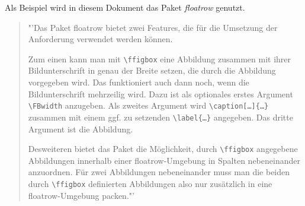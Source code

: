 Als Beispiel wird in diesem Dokument das Paket \emph{floatrow} genutzt.
\begin{quote}
	"'Das Paket floatrow bietet zwei Features, die für die Umsetzung der Anforderung verwendet werden können.
	
	Zum einen kann man mit \verb|\ffigbox| eine Abbildung zusammen mit ihrer Bildunterschrift in genau der Breite setzen, die durch die Abbildung vorgegeben wird. Das funktioniert auch dann noch, wenn die Bildunterschrift mehrzeilig wird. Dazu ist als optionales erstes Argument \verb|\FBwidth| anzugeben. Als zweites Argument wird \verb|\caption[…]{…}| zusammen mit einem ggf. zu setzenden \verb|\label{…}| angegeben. Das dritte Argument ist die Abbildung.
	
	Desweiteren bietet das Paket die Möglichkeit, durch \verb|\ffigbox| angegebene Abbildungen innerhalb einer floatrow-Umgebung in Spalten nebeneinander anzuordnen. Für zwei Abbildungen nebeneinander muss man die beiden durch \verb|\ffigbox| definierten Abbildungen also nur zusätzlich in eine floatrow-Umgebung packen."'\cite{floatrow}
\end{quote}
\begin{figure}[h]
	\centering
	\begin{floatrow}
	\end{floatrow}
\end{figure}

